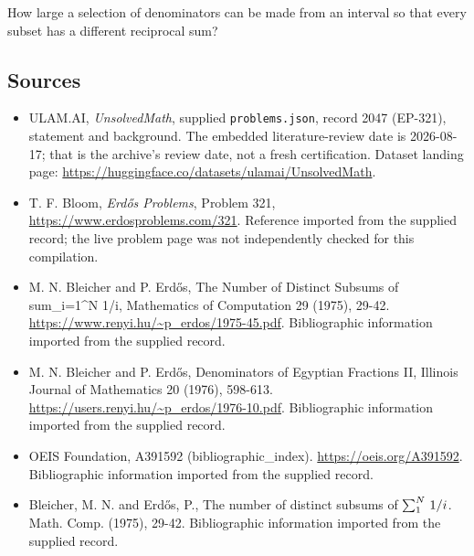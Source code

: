 \documentclass[11pt,a4paper]{article}
\begin{document}
How large a selection of denominators can be made from an interval so that every subset has a different reciprocal sum?

\subsection{Sources}

{\small

\begin{itemize}

\item[\hypertarget{source:2047:1}{S1}] ULAM.AI, \emph{UnsolvedMath}, supplied \texttt{problems.json}, record 2047 (EP-321), statement and background. The embedded literature-review date is 2026-08-17; that is the archive’s review date, not a fresh certification. Dataset landing page: \url{https://huggingface.co/datasets/ulamai/UnsolvedMath}.

\item[\hypertarget{source:2047:2}{S2}] T. F. Bloom, \emph{Erdős Problems}, Problem 321, \url{https://www.erdosproblems.com/321}. Reference imported from the supplied record; the live problem page was not independently checked for this compilation.

\item[\hypertarget{source:2047:3}{S3}] M. N. Bleicher and P. Erdős, The Number of Distinct Subsums of sum\_{i=1}\textasciicircum{}N 1/i, Mathematics of Computation 29 (1975), 29-42. \url{https://www.renyi.hu/~p_erdos/1975-45.pdf}. Bibliographic information imported from the supplied record.

\item[\hypertarget{source:2047:4}{S4}] M. N. Bleicher and P. Erdős, Denominators of Egyptian Fractions II, Illinois Journal of Mathematics 20 (1976), 598-613. \url{https://users.renyi.hu/~p_erdos/1976-10.pdf}. Bibliographic information imported from the supplied record.

\item[\hypertarget{source:2047:5}{S5}] OEIS Foundation, A391592 (bibliographic\_index). \url{https://oeis.org/A391592}. Bibliographic information imported from the supplied record.

\item[\hypertarget{source:2047:6}{S6}] Bleicher, M. N. and Erd\H{o}s, P., The number of distinct subsums of $\sum \sb{1}^{N}\,1/i$. Math. Comp. (1975), 29-42. Bibliographic information imported from the supplied record.

\end{itemize}

}

\label{end:2047}
\end{document}
